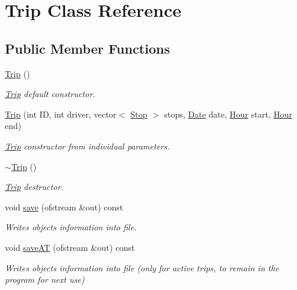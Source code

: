 \hypertarget{class_trip}{}\section{Trip Class Reference}
\label{class_trip}
\subsection*{Public Member Functions}
\begin{DoxyCompactItemize}
\item 
\hyperlink{group___trip_gaa67b77d0d2de622ed5eb9e9cad34db8f}{Trip} ()
\begin{DoxyCompactList}\small\item\em \hyperlink{class_trip}{Trip} default constructor. \end{DoxyCompactList}\item 
\hyperlink{group___trip_gaadf8ba70a9d5aa210149b5162e402512}{Trip} (int ID, int driver, vector$<$ \hyperlink{class_stop}{Stop} $>$ stops, \hyperlink{class_date}{Date} date, \hyperlink{class_hour}{Hour} start, \hyperlink{class_hour}{Hour} end)
\begin{DoxyCompactList}\small\item\em \hyperlink{class_trip}{Trip} constructor from individual parameters. \end{DoxyCompactList}\item 
\hyperlink{group___trip_ga2376daed3b03469163782ef0d0533d52}{$\sim$\+Trip} ()
\begin{DoxyCompactList}\small\item\em \hyperlink{class_trip}{Trip} destructor. \end{DoxyCompactList}\item 
void \hyperlink{group___trip_ga6ae6134652b644fa63bf267b956f1e75}{save} (ofstream \&out) const
\begin{DoxyCompactList}\small\item\em Writes object\textquotesingle{}s information into file. \end{DoxyCompactList}\item 
void \hyperlink{group___trip_gafcf569c0a9d6e5a47134f7e9dd62334a}{save\+AT} (ofstream \&out) const
\begin{DoxyCompactList}\small\item\em Writes object\textquotesingle{}s information into file (only for active trips, to remain in the program for next use) \end{DoxyCompactList}\end{DoxyCompactItemize}
